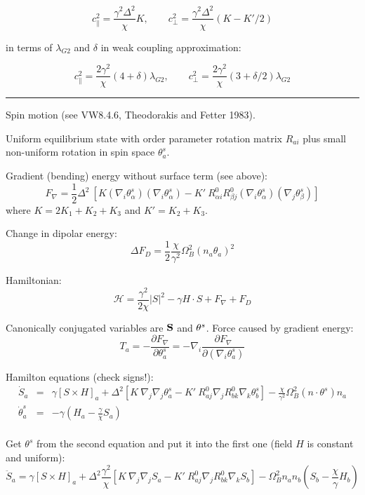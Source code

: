 \documentclass[a4paper]{article}
\begin{document}
$$
c_\parallel^2 = \frac{\gamma^2 \Delta^2}{\chi} K,\qquad
c_\perp^2 = \frac{\gamma^2 \Delta^2}{\chi} (K-K'/2)
$$

in terms of $\lambda_{G2}$ and $\delta$ in weak coupling approximation:

$$
c_\parallel^2 = \frac{2\gamma^2}{\chi} (4+\delta)\lambda_{G2},\qquad
c_\perp^2     = \frac{2\gamma^2}{\chi} (3+\delta/2)\lambda_{G2}
$$



\eject
\hrule
\medskip

Spin motion (see VW8.4.6, Theodorakis and Fetter 1983).

Uniform equilibrium state with order parameter rotation matrix $R_{ai}$ plus
small non-uniform rotation in spin space $\theta^s_a$.

Gradient (bending) energy without surface term (see above):
$$
F_\nabla = \frac12 \Delta^2\ [
K (\nabla_i\theta^s_\alpha) (\nabla_i\theta^s_\alpha)
- K'\ R^0_{\alpha i}R^0_{\beta j}(\nabla_i\theta^s_\alpha)(\nabla_j\theta^s_\beta)]
$$
where $K=2K_1+K_2+K_3$ and $K'=K_2+K_3$.

Change in dipolar energy:
$$
\Delta F_D = \frac12 \frac{\chi}{\gamma^2}\Omega_B^2 (n_a \theta_a)^2
$$

Hamiltonian:
$$
\mathcal{H} = \frac{\gamma^2}{2\chi} |S|^2 - \gamma H \cdot S + F_\nabla +  F_D
$$

Canonically conjugated variables are $\bf S$ and ${\bf \theta}^s$. Force
caused by gradient energy:
$$
T_a = -\frac{\partial F_\nabla}{\partial\theta_a^s}
= -\nabla_i \frac{\partial F_\nabla}{\partial(\nabla_i\theta_a^s)}
$$

Hamilton equations (check signs!):
\begin{eqnarray*}
\dot S_a
&=& \gamma [S\times H]_a
 + \Delta^2[K\ \nabla_j\nabla_j \theta_a^s
 - K'\ R^0_{aj}\nabla_j R^0_{bk}\nabla_k\theta_b^s]
- \frac{\chi}{\gamma^2}\Omega_B^2 (n\cdot\theta^s) n_a\\
\dot \theta_a^s &=& -\gamma \left(H_a-\frac{\gamma}{\chi} S_a\right)\\
\end{eqnarray*}

Get $\theta^s$ from the second equation and put it into the first one
(field $H$ is constant and uniform):
$$
\ddot S_a
= \gamma [S\times H]_a
+ \Delta^2\frac{\gamma^2}{\chi}
  [K\ \nabla_j\nabla_j S_a
 - K'\ R^0_{aj}\nabla_j R^0_{bk}\nabla_k  S_b]
- \Omega_B^2 n_a n_b ( S_b -\frac{\chi}{\gamma}H_b)
$$
\end{document}
